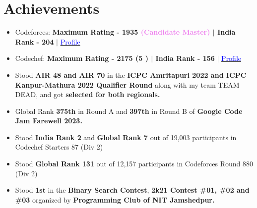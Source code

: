 \documentclass[letterpaper,11pt]{article}
\newcommand{\resumeItem}[1]{
\item\large{
{#1 \vspace{-2pt}}
}
}
\newcommand{\resumeItemListStart}{\begin{itemize}}
\newcommand{\resumeItemListEnd}{\end{itemize}\vspace{-5pt}}
\begin{document}
\vspace{-18pt}
\section{Achievements}
\resumeItemListStart

\resumeItem{Codeforces: \textbf{Maximum Rating - 1935 \textcolor{violet}{(Candidate Master)} $|$ India Rank - 204} $|$ \href{https://codeforces.com/profile/mhtkrag}{\textcolor{blue}{Profile}}}
\vspace{-5pt}

\resumeItem{Codechef: \textbf{Maximum Rating - 2175 {(5 \faStar)} $|$ India Rank - 156} $|$ \href{https://www.codechef.com/users/mohitagrawal32}{\textcolor{blue}{Profile}}}
\vspace{-5pt}

\resumeItem{Stood {\bf AIR 48 and AIR 70} in the {\bf ICPC Amritapuri 2022 and ICPC Kanpur-Mathura 2022 Qualifier Round} along with my team TEAM DEAD, and got {\bf selected for both regionals.}}
\vspace{-5pt}

\resumeItem{Global Rank {\bf 375th} in Round A and {\bf 397th} in Round B of {\bf Google Code Jam Farewell 2023.}}
\vspace{-5pt}

\resumeItem{Stood {\bf India Rank 2} and {\bf Global Rank 7} out of 19,003 participants in Codechef Starters 87 (Div 2)}
\vspace{-5pt}

\resumeItem{Stood {\bf Global Rank 131} out of 12,157 participants in Codeforces Round 880 (Div 2)}
\vspace{-5pt}

\resumeItem{Stood {\bf 1st} in the {\bf Binary Search Contest}, {\bf 2k21 Contest \#01, \#02 and \#03 } organized by {\bf Programming Club of  NIT Jamshedpur.}}
\vspace{-5pt}

\resumeItemListEnd
\vspace{-8pt}

\end{document}
